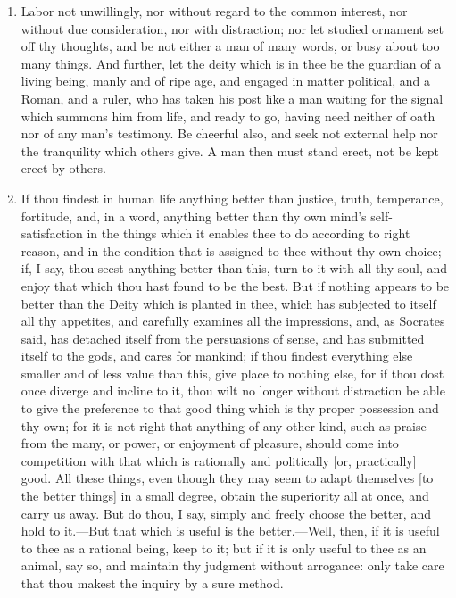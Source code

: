 \begin{enumerate}
\item Labor not unwillingly, nor without regard to the common interest, nor without due consideration, nor with distraction; nor let studied ornament set off thy thoughts, and be not either a man of many words, or busy about too many things. And further, let the deity which is in thee be the guardian of a living being, manly and of ripe age, and engaged in matter political, and a Roman, and a ruler, who has taken his post like a man waiting for the signal which summons him from life, and ready to go, having need neither of oath nor of any man's testimony. Be cheerful also, and seek not external help nor the tranquility which others give. A man then must stand erect, not be kept erect by others.

\item If thou findest in human life anything better than justice, truth, temperance, fortitude, and, in a word, anything better than thy own mind's self-satisfaction in the things which it enables thee to do according to right reason, and in the condition that is assigned to thee without thy own choice; if, I say, thou seest anything better than this, turn to it with all thy soul, and enjoy that which thou hast found to be the best. But if nothing appears to be better than the Deity which is planted in thee, which has subjected to itself all thy appetites, and carefully examines all the impressions, and, as Socrates said, has detached itself from the persuasions of sense, and has submitted itself to the gods, and cares for mankind; if thou findest everything else smaller and of less value than this, give place to nothing else, for if thou dost once diverge and incline to it, thou wilt no longer without distraction be able to give the preference to that good thing which is thy proper possession and thy own; for it is not right that anything of any other kind, such as praise from the many, or power, or enjoyment of pleasure, should come into competition with that which is rationally and politically [{\clarify or, practically}] good. All these things, even though they may seem to adapt themselves [{\clarify to the better things}] in a small degree, obtain the superiority all at once, and carry us away. But do thou, I say, simply and freely choose the better, and hold to it.—But that which is useful is the better.—Well, then, if it is useful to thee as a rational being, keep to it; but if it is only useful to thee as an animal, say so, and maintain thy judgment without arrogance: only take care that thou makest the inquiry by a sure method.


\end{enumerate}
